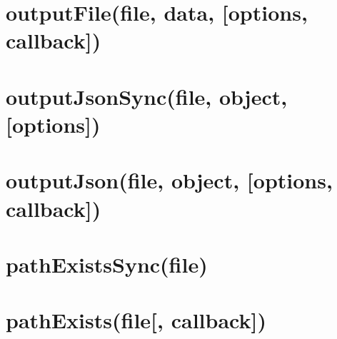 \documentclass[twoside]{book}
\newcommand{\+}{\discretionary{\mbox{\scriptsize$\hookleftarrow$}}{}{}}
\begin{document}
\chapter{output\+File(file, data, \mbox{[}options, callback\mbox{]})}
\label{md_dsmacc_vis_degree_node_modules_electron-packager_node_modules_fs-extra_docs_outputFile}

\chapter{output\+Json\+Sync(file, object, \mbox{[}options\mbox{]})}
\label{md_dsmacc_vis_degree_node_modules_electron-packager_node_modules_fs-extra_docs_outputJson-sync}

\chapter{output\+Json(file, object, \mbox{[}options, callback\mbox{]})}
\label{md_dsmacc_vis_degree_node_modules_electron-packager_node_modules_fs-extra_docs_outputJson}

\chapter{path\+Exists\+Sync(file)}
\label{md_dsmacc_vis_degree_node_modules_electron-packager_node_modules_fs-extra_docs_pathExists-sync}

\chapter{path\+Exists(file\mbox{[}, callback\mbox{]})}
\label{md_dsmacc_vis_degree_node_modules_electron-packager_node_modules_fs-extra_docs_pathExists}

\end{document}

